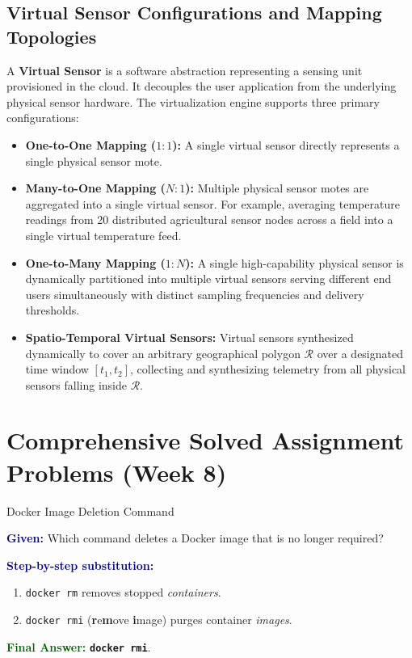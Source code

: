 \documentclass[11pt,a4paper,openany]{report}
\newcommand{\Given}{\par\textbf{\textcolor{navy}{Given:}} }
\newcommand{\Steps}{\par\textbf{\textcolor{navy}{Step-by-step substitution:}}\par}
\newcommand{\Answer}{\par\textbf{\textcolor{darkgreen}{Final Answer:}} }
\begin{document}
\subsection{Virtual Sensor Configurations and Mapping Topologies}
A \textbf{Virtual Sensor} is a software abstraction representing a sensing unit provisioned in the cloud. It decouples the user application from the underlying physical sensor hardware. The virtualization engine supports three primary configurations:

\begin{itemize}[leftmargin=*]
  \item \textbf{One-to-One Mapping ($1:1$):} A single virtual sensor directly represents a single physical sensor mote.
  \item \textbf{Many-to-One Mapping ($N:1$):} Multiple physical sensor motes are aggregated into a single virtual sensor. For example, averaging temperature readings from 20 distributed agricultural sensor nodes across a field into a single virtual temperature feed.
  \item \textbf{One-to-Many Mapping ($1:N$):} A single high-capability physical sensor is dynamically partitioned into multiple virtual sensors serving different end users simultaneously with distinct sampling frequencies and delivery thresholds.
  \item \textbf{Spatio-Temporal Virtual Sensors:} Virtual sensors synthesized dynamically to cover an arbitrary geographical polygon $\mathcal{R}$ over a designated time window $[t_1, t_2]$, collecting and synthesizing telemetry from all physical sensors falling inside $\mathcal{R}$.
\end{itemize}

\section{Comprehensive Solved Assignment Problems (Week 8)}

\begin{solved}{Docker Image Deletion Command}
\Given Which command deletes a Docker image that is no longer required?
\Steps
\begin{enumerate}[leftmargin=*]
  \item \texttt{docker rm} removes stopped \emph{containers}.
  \item \texttt{docker rmi} (\textbf{r}e\textbf{m}ove \textbf{i}mage) purges container \emph{images}.
\end{enumerate}
\Answer \textbf{\texttt{docker rmi}}.
\end{solved}
\end{document}

